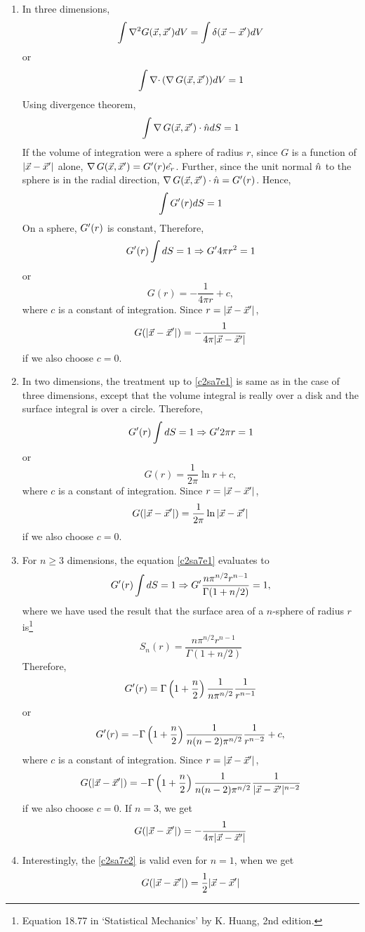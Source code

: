 \begin{enumerate}
\item In three dimensions,
\[
\int\nabla^2 G(\vec{x}, \vec{x}^\prime) dV = \int \delta(\vec{x} - \vec{x}^\prime) dV
\]
or
\[
\int\operatorname{\nabla\cdot}{(\operatorname{\nabla}{G(\vec{x}, \vec{x}^\prime)})}dV = 1
\]
Using divergence theorem,
\[
\int \operatorname{\nabla}{G(\vec{x}, \vec{x}^\prime})\cdot\hat{n} dS = 1
\]
If the volume of integration were a sphere of radius $r$, since $G$ is a function of $|\vec{x} - \vec{x}^\prime|$ alone, $\operatorname{\nabla}{G(\vec{x}, \vec{x}^\prime}) = G^\prime(r)\hat{e_{r}}$. Further, 
since the unit normal $\hat{n}$ to the sphere is in the radial direction, $\operatorname{\nabla}{G(\vec{x}, \vec{x}^\prime})\cdot\hat{n} = G^\prime(r)$. Hence,
\begin{equation}\label{c2sa7e1}
\int G^\prime(r) dS = 1
\end{equation}
On a sphere, $G^\prime(r)$ is constant, Therefore,
\[
G^\prime(r)\int dS = 1 \Rightarrow G^\prime 4\pi r^2 = 1
\]
or
\[
G(r) = -\frac{1}{4\pi r} + c,
\]
where $c$ is a constant of integration. Since $r = |\vec{x} - \vec{x}^\prime|$,
\[
G(|\vec{x} - \vec{x}^\prime|) = -\frac{1}{4\pi|\vec{x} - \vec{x}^\prime|}
\]
if we also choose $c = 0$.

\item In two dimensions, the treatment up to \eqref{c2sa7e1} is same as in the case of three dimensions, except that the volume integral is really over a disk and the surface integral is 
over a circle. Therefore,
\[
G^\prime(r)\int dS = 1 \Rightarrow G^\prime 2\pi r = 1
\]
or
\[
G(r) = \frac{1}{2\pi}\ln r + c,
\]
where $c$ is a constant of integration. Since $r = |\vec{x} - \vec{x}^\prime|$,
\[
G(|\vec{x} - \vec{x}^\prime|) = \frac{1}{2\pi}\ln|\vec{x} - \vec{x}^\prime|
\]
if we also choose $c = 0$.

\item For $n \ge 3$ dimensions, the equation \eqref{c2sa7e1} evaluates to
\[
G^\prime(r)\int dS = 1 \Rightarrow G^\prime \frac{n \pi^{n/2} r^{n - 1}}{\Gamma(1 + n/2)} = 1,
\]
where we have used the result that the surface area of a $n$-sphere of radius $r$ is{\footnote{Equation 18.77 in \enquote*{Statistical Mechanics} by K. Huang, 2nd edition.}}
\[
S_n(r) = \frac{n \pi^{n/2} r^{n - 1}}{\Gamma(1 + n/2)}
\]
Therefore,
\[
G^\prime(r) = \Gamma\left(1 + \frac{n}{2}\right)\frac{1}{n \pi^{n/2}}\frac{1}{r^{n-1}}
\]
or
\[
G^\prime(r) = -\Gamma\left(1 + \frac{n}{2}\right)\frac{1}{n(n - 2) \pi^{n/2}}\frac{1}{r^{n - 2}} + c,
\]
where $c$ is a constant of integration. Since $r = |\vec{x} - \vec{x}^\prime|$,
\begin{equation}\label{c2sa7e2}
G(|\vec{x} - \vec{x}^\prime|) = -\Gamma\left(1 + \frac{n}{2}\right)\frac{1}{n(n - 2) \pi^{n/2}}\frac{1}{|\vec{x} - \vec{x}^\prime|^{n - 2}}
\end{equation}
if we also choose $c = 0$. If $n = 3$, we get 
\[
G(|\vec{x} - \vec{x}^\prime|) = -\frac{1}{4\pi|\vec{x} - \vec{x}^\prime|}
\]

\item Interestingly, the \eqref{c2sa7e2} is valid even for $n = 1$, when we get
\[
 G(|\vec{x} - \vec{x}^\prime|) = \frac{1}{2}|\vec{x} - \vec{x}^\prime|
\]
\end{enumerate}


